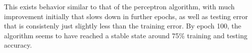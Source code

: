 \documentclass{article}
\begin{document}
This exists behavior similar to that of the perceptron algorithm, with much improvement initially that slows down in further epochs, as well as testing error that is consistenly just slightly less than the training error. By epoch 100, the algorithm seems to have reached a stable state around 75\% training and testing accuracy.
\end{document}
